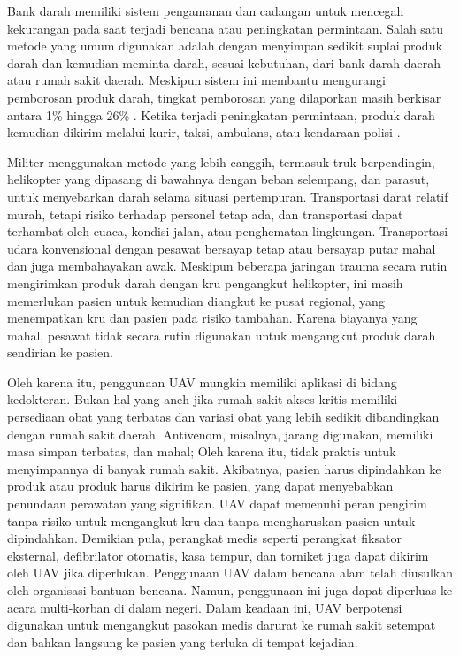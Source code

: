Bank darah memiliki sistem pengamanan dan cadangan untuk mencegah kekurangan pada saat terjadi bencana atau peningkatan permintaan. Salah satu metode yang umum digunakan adalah dengan menyimpan sedikit suplai produk darah dan kemudian meminta darah, sesuai kebutuhan, dari bank darah daerah atau rumah sakit daerah. Meskipun sistem ini membantu mengurangi pemborosan produk darah, tingkat pemborosan yang dilaporkan masih berkisar antara 1\% hingga 26\% \citep{galloway2008tabletop}. Ketika terjadi peningkatan permintaan, produk darah kemudian dikirim melalui kurir, taksi, ambulans, atau kendaraan polisi \citep{sandler2002transportation}. 

Militer menggunakan metode yang lebih canggih, termasuk truk berpendingin, helikopter yang dipasang di bawahnya dengan beban selempang, dan parasut, untuk menyebarkan darah selama situasi pertempuran. Transportasi darat relatif murah, tetapi risiko terhadap personel tetap ada, dan transportasi dapat terhambat oleh cuaca, kondisi jalan, atau penghematan lingkungan. Transportasi udara konvensional dengan pesawat bersayap tetap atau bersayap putar mahal dan juga membahayakan awak. Meskipun beberapa jaringan trauma secara rutin mengirimkan produk darah dengan kru pengangkut helikopter, ini masih memerlukan pasien untuk kemudian diangkut ke pusat regional, yang menempatkan kru dan pasien pada risiko tambahan. Karena biayanya yang mahal, pesawat tidak secara rutin digunakan untuk mengangkut produk darah sendirian ke pasien.

Oleh karena itu, penggunaan UAV mungkin memiliki aplikasi di bidang kedokteran. Bukan hal yang aneh jika rumah sakit akses kritis memiliki persediaan obat yang terbatas dan variasi obat yang lebih sedikit dibandingkan dengan rumah sakit daerah. Antivenom, misalnya, jarang digunakan, memiliki masa simpan terbatas, dan mahal; Oleh karena itu, tidak praktis untuk menyimpannya di banyak rumah sakit. Akibatnya, pasien harus dipindahkan ke produk atau produk harus dikirim ke pasien, yang dapat menyebabkan penundaan perawatan yang signifikan. UAV dapat memenuhi peran pengirim tanpa risiko untuk mengangkut kru dan tanpa mengharuskan pasien untuk dipindahkan. Demikian pula, perangkat medis seperti perangkat fiksator eksternal, defibrilator otomatis, kasa tempur, dan torniket juga dapat dikirim oleh UAV jika diperlukan. Penggunaan UAV dalam bencana alam telah diusulkan oleh organisasi bantuan bencana. Namun, penggunaan ini juga dapat diperluas ke acara multi-korban di dalam negeri. Dalam keadaan ini, UAV berpotensi digunakan untuk mengangkut pasokan medis darurat ke rumah sakit setempat dan bahkan langsung ke pasien yang terluka di tempat kejadian.

